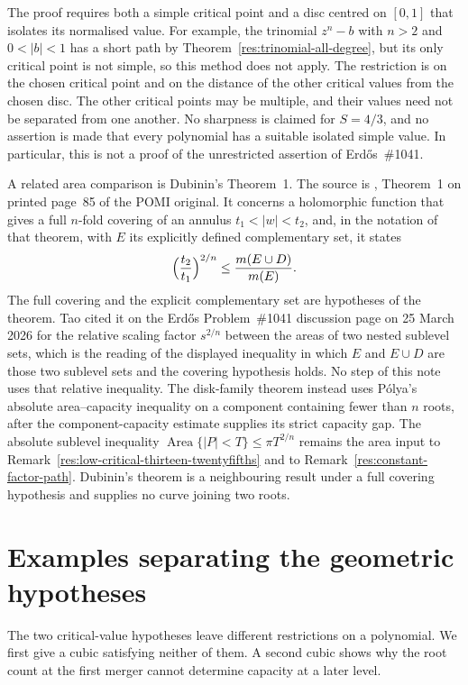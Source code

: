 The proof requires both a simple critical point and a disc centred on
$[0,1]$ that isolates its normalised value. For example, the trinomial
$z^n-b$ with $n>2$ and $0<|b|<1$ has a short path by
Theorem~\ref{res:trinomial-all-degree}, but its only critical point is not
simple, so this method does not apply. The restriction is on the chosen
critical point and on the distance of the other critical values from the
chosen disc. The other critical points may be multiple, and their values
need not be separated from one another. No sharpness is claimed for
$S=4/3$, and no assertion is made that every polynomial has a suitable
isolated simple value. In particular, this is not a proof of the
unrestricted assertion of Erd\H{o}s~\#1041.

A related area comparison is Dubinin's Theorem~1. The
source is \cite{dubinin}, Theorem~1 on printed page~85 of the POMI original.
It concerns a holomorphic function that gives a full $n$-fold covering of an
annulus $t_1<|w|<t_2$, and, in the notation of that theorem, with $E$ its
explicitly defined complementary set, it states
\[
 \Bigl(\frac{t_2}{t_1}\Bigr)^{2/n}\le\frac{m(E\cup D)}{m(E)}.
\]
The full covering and the explicit complementary set are hypotheses of the
theorem.  Tao cited it on the Erd\H{o}s Problem~\#1041 discussion page on
25 March 2026 for the relative scaling factor $s^{2/n}$ between the areas of
two nested sublevel sets, which is the reading of the displayed inequality in
which $E$ and $E\cup D$ are those two sublevel sets and the covering
hypothesis holds.  No step of this note uses that relative inequality.  The
disk-family theorem instead uses P\'olya's absolute area--capacity inequality
on a component containing fewer than $n$ roots, after the
component-capacity estimate supplies its strict
capacity gap.  The absolute sublevel inequality
$\operatorname{Area}\{|P|<T\}\le\pi T^{2/n}$ remains the area input to
Remark~\ref{res:low-critical-thirteen-twentyfifths} and to
Remark~\ref{res:constant-factor-path}.  Dubinin's theorem is a neighbouring
result under a full covering hypothesis and supplies no curve joining two roots.

\section{Examples separating the geometric hypotheses}\label{sec:component-examples}

The two critical-value hypotheses leave different restrictions on a
polynomial. We first give a cubic satisfying neither of them. A second
cubic shows why the root count at the first merger cannot determine
capacity at a later level.

